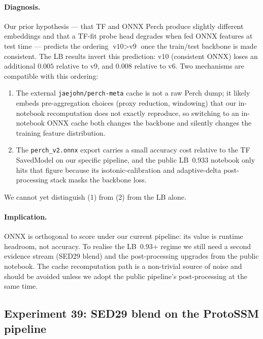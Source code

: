 \paragraph{Diagnosis.}
Our prior hypothesis --- that TF and ONNX Perch produce slightly
different embeddings and that a TF-fit probe head degrades when fed
ONNX features at test time --- predicts the ordering
$\text{v10} > \text{v9}$ once the train/test backbone is made
consistent. The LB results invert this prediction:
v10 (consistent ONNX) loses an additional $0.005$ relative to v9,
and $0.008$ relative to v6. Two mechanisms are compatible with this
ordering:
\begin{enumerate}
\item The external \texttt{jaejohn/perch-meta} cache is not a raw
Perch dump; it likely embeds pre-aggregation choices (proxy
reduction, windowing) that our in-notebook recomputation does not
exactly reproduce, so switching to an in-notebook ONNX cache both
changes the backbone and silently changes the training feature
distribution.
\item The \texttt{perch\_v2.onnx} export carries a small accuracy
cost relative to the TF SavedModel on our specific pipeline, and
the public LB~0.933 notebook only hits that figure because its
isotonic-calibration and adaptive-delta post-processing stack
masks the backbone loss.
\end{enumerate}
We cannot yet distinguish (1) from (2) from the LB alone.

\paragraph{Implication.}
ONNX is orthogonal to score under our current pipeline: its value
is runtime headroom, not accuracy. To realise the LB~0.93+ regime we
still need a second evidence stream (SED29 blend) and the
post-processing upgrades from the public notebook. The cache
recomputation path is a non-trivial source of noise and should be
avoided unless we adopt the public pipeline's post-processing at
the same time.

\subsection{Experiment 39: SED29 blend on the ProtoSSM pipeline}

